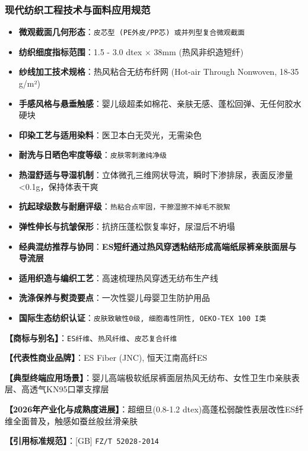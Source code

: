 \documentclass[11pt,openright,twoside,UTF8]{ctexbook}
\begin{document}
\subsubsection*{现代纺织工程技术与面料应用规范}
\begin{itemize} \setlength{\itemsep}{2pt}
    \item \textbf{微观截面几何形态}：\texttt{皮芯型 (PE外皮/PP芯) 或并列型复合微观截面}
    \item \textbf{纺织细度指标范围}：1.5 - 3.0 dtex $\times$ 38mm (热风非织造短纤)
    \item \textbf{纱线加工技术规格}：热风粘合无纺布纤网 (Hot-air Through Nonwoven, 18-35 g/m²)
    \item \textbf{手感风格与悬垂触感}：婴儿级超柔如棉花、亲肤无感、蓬松回弹、无任何胶水硬块
    \item \textbf{印染工艺与适用染料}：医卫本白无荧光，无需染色
    \item \textbf{耐洗与日晒色牢度等级}：\texttt{皮肤零刺激纯净级}
    \item \textbf{热湿舒适与导湿机制}：立体微孔三维网状导流，瞬时下渗排尿，表面反渗量\textless{}0.1g，保持体表干爽
    \item \textbf{抗起球级数与耐磨评级}：\texttt{热粘合点牢固，干擦湿擦不掉毛不脱絮}
    \item \textbf{弹性伸长与抗皱保形}：抗挤压蓬松恢复率好，尿湿后不坍塌
    \item \textbf{经典混纺推荐与协同}：\textbf{ES短纤通过热风穿透粘结形成高端纸尿裤亲肤面层与导流层}
    \item \textbf{适用织造与编织工艺}：高速梳理热风穿透无纺布生产线
    \item \textbf{洗涤保养与熨烫要点}：一次性婴儿母婴卫生防护用品
    \item \textbf{国际生态纺织认证}：\texttt{皮肤致敏性0级, 细胞毒性阴性, OEKO-TEX 100 I类}
\end{itemize}
\vspace{0.2cm}

\noindent\textbf{【商标与别名】}：\texttt{ES纤维}、\texttt{热风纤维}、\texttt{皮芯复合纤维}\par
\noindent\textbf{【代表性商业品牌】}：ES Fiber (JNC), 恒天江南高纤ES\par
\noindent\textbf{【典型终端应用场景】}：婴儿高端极软纸尿裤面层热风无纺布、女性卫生巾亲肤表层、高透气KN95口罩支撑层\par
\noindent\textbf{【2026年产业化与成熟度进展】}：超细旦(0.8-1.2 dtex)高蓬松弱酸性表层改性ES纤维全面普及，触感如蚕丝般丝滑亲肤\par
\noindent\textbf{【引用标准规范】}：[GB] \texttt{FZ/T 52028-2014}\par
\vspace{0.5cm}
\end{document}
